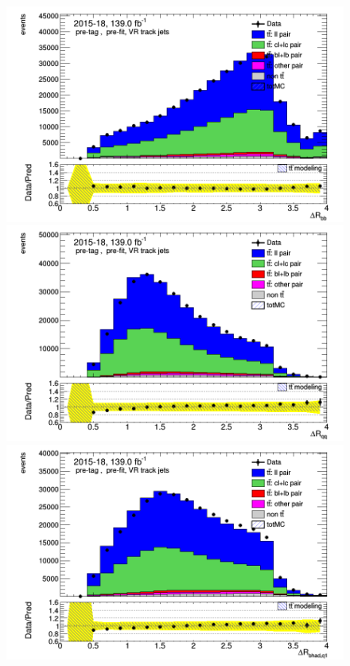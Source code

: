 \documentclass[letterpaper,12pt]{article}
\begin{document}
\begin{figure}
\begin{minipage}[b]{.45\textwidth}
\centering
\includegraphics[width=1\textwidth]{Oct_distributions/pretagNoRwDL1rwithhighpTVRJets_scaledall/DataMC_dRbb.png}
\end{minipage}\hfill
\begin{minipage}[b]{.45\textwidth}
\centering
\includegraphics[width=1\textwidth]{Oct_distributions/pretagNoRwDL1rwithhighpTVRJets_scaledall/DataMC_dRqq.png}
\end{minipage}\hfill
\begin{minipage}[b]{.45\textwidth}
\centering
\includegraphics[width=1\textwidth]{Oct_distributions/pretagNoRwDL1rwithhighpTVRJets_scaledall/DataMC_dRbhadq1.png}

\end{minipage}
\end{figure}
\end{document}
